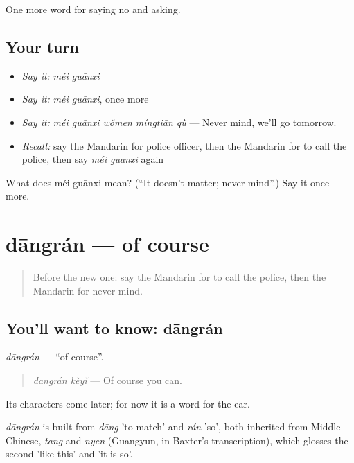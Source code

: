 \begin{grammarlens}[title={What you've built}]
One more word for saying no and asking.
\end{grammarlens}

\subsection*{Your turn}
\begin{itemize}
\raggedright
  \item \emph{Say it:} \emph{méi guānxi}
  \item \emph{Say it:} \emph{méi guānxi}, once more
  \item \emph{Say it:} \emph{méi guānxi wǒmen míngtiān qù} — Never mind, we'll go tomorrow.
  \item \emph{Recall:} say the Mandarin for police officer, then the Mandarin for to call the police, then say \emph{méi guānxi} again
\end{itemize}

\begin{tcolorbox}[breakable,colback=teal!4,colframe=teal!35!black,title={Before you move on}]
What does méi guānxi mean? (\textquotedblleft{}It doesn't matter; never mind\textquotedblright{}.) Say it once more.
\end{tcolorbox}
\section[dāngrán]{dāngrán — of course}

\label{lesson:ZH-C217-dangran}



\begin{quote}
Before the new one: say the Mandarin for to call the police, then the Mandarin for never mind.
\end{quote}

\subsection*{You'll want to know: dāngrán}
\emph{dāngrán} — \textquotedblleft{}of course\textquotedblright{}.

\begin{quote}
\emph{dāngrán kěyǐ} — Of course you can.
\end{quote}

Its characters come later; for now it is a word for the ear.

\begin{cousinweb}
\emph{dāngrán} is built from \emph{dāng} 'to match' and \emph{rán} 'so', both inherited from Middle Chinese, \emph{tang} and \emph{nyen} (Guangyun, in Baxter's transcription), which glosses the second 'like this' and 'it is so'.
\end{cousinweb}

